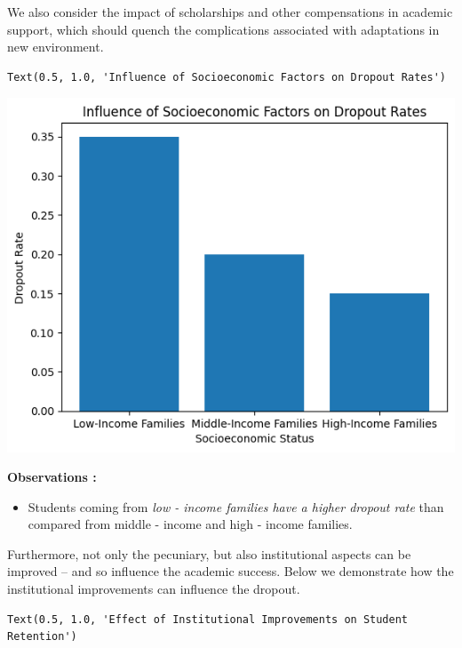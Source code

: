 \documentclass[
  letterpaper,
  DIV=11,
  numbers=noendperiod]{scrartcl}
\providecommand{\tightlist}{%
  \setlength{\itemsep}{0pt}\setlength{\parskip}{0pt}}\usepackage{longtable,booktabs,array}
\begin{document}
We also consider the impact of scholarships and other compensations in
academic support, which should quench the complications associated with
adaptations in new environment.

\begin{verbatim}
Text(0.5, 1.0, 'Influence of Socioeconomic Factors on Dropout Rates')
\end{verbatim}

\includegraphics{report_AzadhdhinNedalYunisAlFraijat_files/figure-pdf/cell-21-output-2.png}

\textbf{Observations :}

\begin{itemize}
\tightlist
\item
  Students coming from \emph{low - income families have a higher dropout
  rate} than compared from middle - income and high - income families.
\end{itemize}

Furthermore, not only the pecuniary, but also institutional aspects can
be improved -- and so influence the academic success. Below we
demonstrate how the institutional improvements can influence the
dropout.

\begin{verbatim}
Text(0.5, 1.0, 'Effect of Institutional Improvements on Student Retention')
\end{verbatim}
\end{document}
